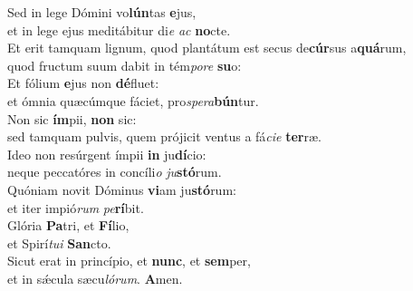 \evenverse Sed in lege Dómini vo\textbf{lún}tas \textbf{e}jus,~\*\\
\evenverse et in lege ejus meditábitur di\textit{e} \textit{ac} \textbf{no}cte.\\
\oddverse Et erit tamquam lignum, quod plantátum est secus de\textbf{cúr}sus a\textbf{quá}rum,~\*\\
\oddverse quod fructum suum dabit in tém\textit{po}\textit{re} \textbf{su}o:\\
\evenverse Et fólium \textbf{e}jus non \textbf{dé}fluet:~\*\\
\evenverse et ómnia quæcúmque fáciet, pro\textit{spe}\textit{ra}\textbf{bún}tur.\\
\oddverse Non sic \textbf{ím}pii, \textbf{non} sic:~\*\\
\oddverse sed tamquam pulvis, quem prójicit ventus a fá\textit{ci}\textit{e} \textbf{ter}ræ.\\
\evenverse Ideo non resúrgent ímpii \textbf{in} ju\textbf{dí}cio:~\*\\
\evenverse neque peccatóres in concíli\textit{o} \textit{ju}\textbf{stó}rum.\\
\oddverse Quóniam novit Dóminus \textbf{vi}am ju\textbf{stó}rum:~\*\\
\oddverse et iter impió\textit{rum} \textit{pe}\textbf{rí}bit.\\
\evenverse Glória \textbf{Pa}tri, et \textbf{Fí}lio,~\*\\
\evenverse et Spirí\textit{tu}\textit{i} \textbf{San}cto.\\
\oddverse Sicut erat in princípio, et \textbf{nunc}, et \textbf{sem}per,~\*\\
\oddverse et in sǽcula sæcu\textit{ló}\textit{rum}. \textbf{A}men.\\
